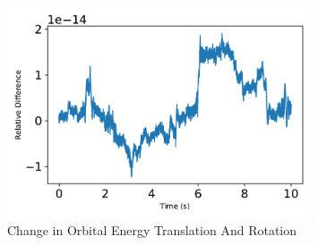 \begin{figure}[htbp]\centerline{\includegraphics[width=0.8\textwidth]{AutoTeX/scPlusChangeInOrbitalEnergyTranslationAndRotation}}\caption{Change in Orbital Energy Translation And Rotation}\label{fig:scPlusChangeInOrbitalEnergyTranslationAndRotation}\end{figure}